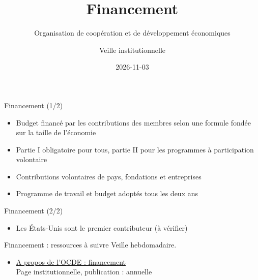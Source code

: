 \documentclass[aspectratio=169,11pt]{beamer}
\title{Financement}
\subtitle{Organisation de coopération et de développement économiques}
\author{Veille institutionnelle}
\date{2026-11-03}
\begin{document}
\begin{frame}\titlepage\end{frame}

\begin{frame}{Financement (1/2)}
\begin{itemize}
\item Budget financé par les contributions des membres selon une formule fondée sur la taille de l'économie
\item Partie I obligatoire pour tous, partie II pour les programmes à participation volontaire
\item Contributions volontaires de pays, fondations et entreprises
\item Programme de travail et budget adoptés tous les deux ans
\end{itemize}
\end{frame}

\begin{frame}{Financement (2/2)}
\begin{itemize}
\item Les États-Unis sont le premier contributeur (à vérifier)
\end{itemize}
\end{frame}

\begin{frame}{Financement : ressources à suivre}
\small
Veille hebdomadaire.
\begin{itemize}
\item \href{https://www.oecd.org/en/about.html}{A propos de l'OCDE : financement}\\{\footnotesize Page institutionnelle, publication : annuelle}
\end{itemize}
\end{frame}
\end{document}
